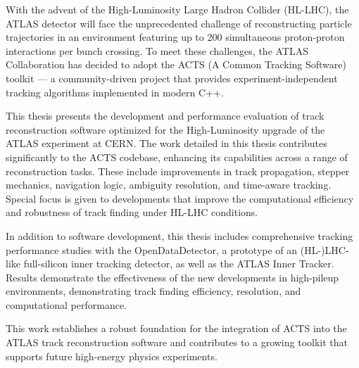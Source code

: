 With the advent of the High-Luminosity Large Hadron Collider (HL-LHC), the ATLAS detector will face the unprecedented challenge of reconstructing particle trajectories in an environment featuring up to 200 simultaneous proton-proton interactions per bunch crossing. To meet these challenges, the ATLAS Collaboration has decided to adopt the ACTS (A Common Tracking Software) toolkit --- a community-driven project that provides experiment-independent tracking algorithms implemented in modern C++.

This thesis presents the development and performance evaluation of track reconstruction software optimized for the High-Luminosity upgrade of the ATLAS experiment at CERN. The work detailed in this thesis contributes significantly to the ACTS codebase, enhancing its capabilities across a range of reconstruction tasks. These include improvements in track propagation, stepper mechanics, navigation logic, ambiguity resolution, and time-aware tracking. Special focus is given to developments that improve the computational efficiency and robustness of track finding under HL-LHC conditions.

In addition to software development, this thesis includes comprehensive tracking performance studies with the OpenDataDetector, a prototype of an (HL-)LHC-like full-silicon inner tracking detector, as well as the ATLAS Inner Tracker. Results demonstrate the effectiveness of the new developments in high-pileup environments, demonstrating track finding efficiency, resolution, and computational performance.

This work establishes a robust foundation for the integration of ACTS into the ATLAS track reconstruction software and contributes to a growing toolkit that supports future high-energy physics experiments.
